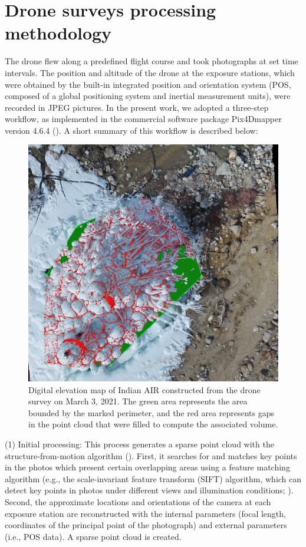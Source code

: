 \section{Drone surveys processing methodology}
\label{sec:drone_method}

The drone flew along a predefined flight course and took photographs at set time intervals. The
position and altitude of the drone at the exposure stations, which were obtained by the built-in integrated
position and orientation system (POS, composed of a global positioning system and inertial measurement units),
were recorded in JPEG pictures. In the present work, we adopted a three-step workflow, as implemented in the
commercial software package Pix4Dmapper version 4.6.4 (\cite{pix4dsaPix4DmapperUserManual2020}). A short summary of this workflow is
described below:

\begin{figure}
	\begin{center}
		\includegraphics[width=12 cm]{figs/pix4d.jpg}
	\end{center}
	\caption{Digital elevation map of Indian \ac{AIR} constructed from the drone survey on March 3, 2021. The green
		area represents the area bounded by the marked perimeter, and the red area represents gaps in the point cloud
    that were filled to compute the associated volume.
	}
	\label{fig:DEM}
\end{figure}

(1) Initial processing: This process generates a sparse point cloud with the structure-from-motion algorithm
(\cite{turnerAutomatedTechniqueGenerating2012}). First, it searches for and matches key points in the photos which present certain overlapping
areas using a feature matching algorithm (e.g., the scale-invariant feature transform (SIFT) algorithm, which can
detect key points in photos under different views and illumination conditions;
\cite{loweDistinctiveImageFeatures2004}). Second, the approximate locations and orientations of the camera at
each exposure station are reconstructed with the internal parameters (focal length, coordinates of the principal
point of the photograph) and external parameters (i.e., POS data). A sparse point cloud is created.

